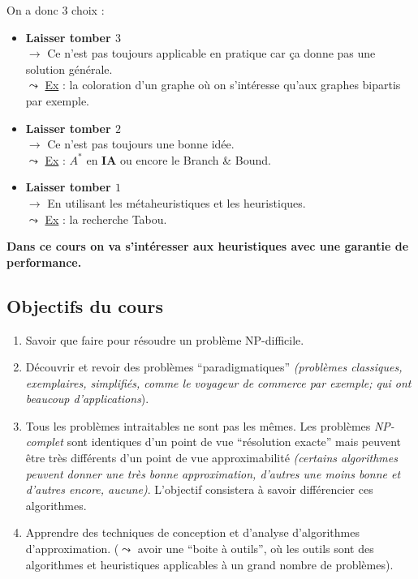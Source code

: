\documentclass{article}
\begin{document}
\begin{sffamily}
\noindent On a donc 3 choix :
\begin{itemize}
\item \textbf{Laisser tomber $3$}\\
$\rightarrow$ Ce n'est pas toujours applicable en pratique car ça donne pas une
solution générale.\\
$\leadsto$ \underline{Ex} : la coloration d'un graphe où on s'intéresse qu'aux
graphes bipartis par exemple.
\item \textbf{Laisser tomber $2$}\\
$\rightarrow$ Ce n'est pas toujours une bonne idée.\\
$\leadsto$ \underline{Ex} : $A^*$ en \textbf{IA} ou encore le Branch \& Bound.
\item \textbf{Laisser tomber $1$}\\
$\rightarrow$ En utilisant les métaheuristiques et les heuristiques.\\
$\leadsto$ \underline{Ex} : la recherche Tabou.\\
\end{itemize}

\textbf{Dans ce cours on va s'intéresser aux heuristiques avec une garantie de
performance.}

\subsection{Objectifs du cours}

\begin{enumerate}
\item Savoir que faire pour résoudre un problème NP-difficile.
\item Découvrir et revoir des problèmes ``paradigmatiques'' \textit{(problèmes
classiques, exemplaires, simplifiés, comme le voyageur de commerce par exemple;
qui ont beaucoup d'applications}).
\item Tous les problèmes intraitables ne sont pas les mêmes. Les problèmes
\textit{NP-complet} sont identiques d'un point de vue ``résolution exacte'' mais
peuvent être très différents d'un point de vue approximabilité
\textit{(certains algorithmes peuvent donner une très bonne approximation,
d'autres une moins bonne et d'autres encore, aucune)}. L'objectif consistera à
savoir différencier ces algorithmes.
\item Apprendre des techniques de conception et d'analyse d'algorithmes
d'approximation. ($\leadsto$ avoir une ``boite à outils'', où les outils sont
des algorithmes et heuristiques applicables à un grand nombre de problèmes).
\end{enumerate}


\end{sffamily}
\end{document}
